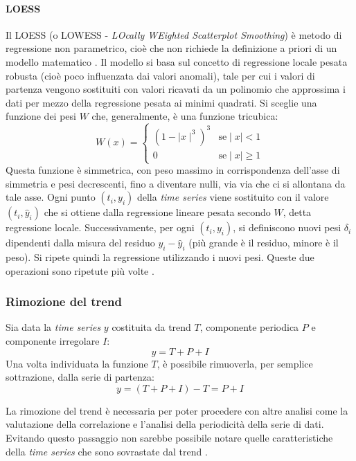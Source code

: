 \paragraph*{LOESS}
Il LOESS (o LOWESS - \textit{LOcally WEighted Scatterplot Smoothing}) è metodo di regressione non parametrico, cioè che non richiede la definizione a priori di un modello matematico \cite{detrending2}.
Il modello si basa sul concetto di regressione locale pesata robusta (cioè poco influenzata dai valori anomali), tale per cui i valori di partenza vengono sostituiti con valori ricavati da un polinomio che approssima i dati per mezzo della regressione pesata ai minimi quadrati.
Si sceglie una funzione dei pesi $W$ che, generalmente, è una funzione tricubica:
\begin{equation}
W(x)=
\begin{cases}
(1-\mid x\mid^{3})^{3}&\mbox{se} \mid x\mid <1\\0&\mbox{se} \mid x\mid\geq1
\end{cases}
\end{equation}
Questa funzione è simmetrica, con peso massimo in corrispondenza dell'asse di simmetria e pesi decrescenti, fino a diventare nulli, via via che ci si allontana da tale asse.
Ogni punto $(t_{i},y_{i})$ della \textit{time series} viene sostituito con il valore $(t_{i},\hat{y}_{i})$ che si ottiene dalla regressione lineare pesata secondo $W$, detta regressione locale. Successivamente, per ogni $(t_{i},y_{i})$, si definiscono nuovi pesi $\delta_{i}$ dipendenti dalla misura del residuo $y_{i}-\hat{y}_{i}$ (più grande è il residuo, minore è il peso). Si ripete quindi la regressione utilizzando i nuovi pesi. Queste due operazioni sono ripetute più volte \cite{LOESS}.

\subsubsection{Rimozione del trend}
\label{subsec:rim_trend}
Sia data la \textit{time series} $y$ costituita da trend $T$, componente periodica $P$ e componente irregolare $I$:
\begin{equation}
y=T+P+I
\end{equation} 
Una volta individuata la funzione $T$, è possibile rimuoverla, per semplice sottrazione, dalla serie di partenza:
\begin{equation}
y=(T+P+I)-T=P+I
\end{equation} 

La rimozione del trend è necessaria per poter procedere con altre analisi come la valutazione della correlazione e l'analisi della periodicità della serie di dati. Evitando questo passaggio non sarebbe possibile notare quelle caratteristiche della \textit{time series} che sono sovrastate dal trend \cite{Wu14889}.

